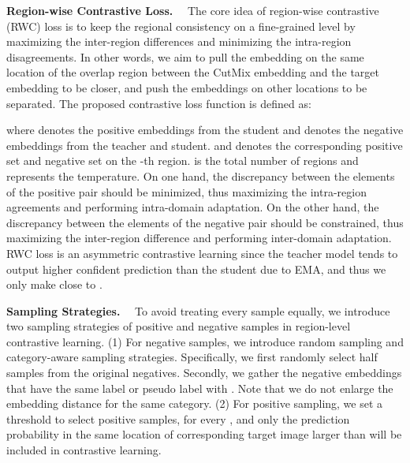 \documentclass{article}
\renewcommand{\paragraph}[1]{\noindent\textbf{#1}~~}
\begin{document}
\paragraph{Region-wise Contrastive Loss.}
The core idea of region-wise contrastive (RWC) loss is to keep the regional consistency on a fine-grained level by maximizing the inter-region differences and minimizing the intra-region disagreements.  In other words, we aim to pull the embedding on the same location of the overlap region between the CutMix embedding   and the target embedding  to be closer, and push the embeddings on other locations to be separated.  The proposed contrastive loss function  is defined as: 

where  
denotes the positive embeddings from the student and  denotes the negative embeddings from the teacher and student.
 and  denotes the corresponding positive set and negative set on the -th region.  is the total number of regions and  represents the temperature. On one hand, the discrepancy between the elements of the positive pair should be minimized, thus maximizing the intra-region agreements and performing intra-domain adaptation. On the other hand, the discrepancy between the elements of the negative pair should be constrained, thus maximizing the inter-region difference and performing inter-domain adaptation. RWC loss is an asymmetric contrastive learning since the teacher model tends to output higher confident prediction than the student due to EMA, and thus we only make  close to . 

\paragraph{Sampling Strategies.}
To avoid treating every sample equally, we introduce two sampling strategies of positive and negative samples in region-level contrastive learning.
(1) For negative samples, we introduce random sampling and category-aware sampling strategies. Specifically, we first randomly select half samples from the original negatives. Secondly, we gather the negative embeddings that have the same label or pseudo label with . Note that we do not enlarge the embedding distance for the same category.
(2) For positive sampling, we set a threshold  to select positive samples, for every , and only the prediction probability in the same location of corresponding target image larger than  will be included in contrastive learning.        
\end{document}
